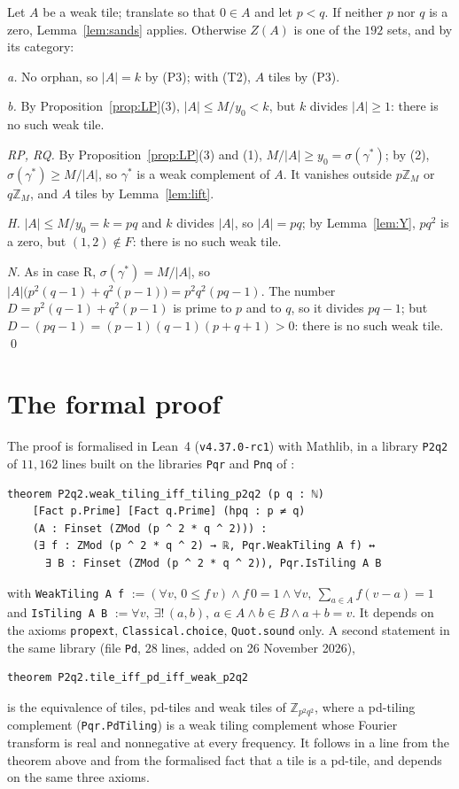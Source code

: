 \documentclass[11pt,a4paper]{amsart}
\theoremstyle{definition}
\theoremstyle{remark}
\newcommand{\Z}{\mathbb{Z}}
\newcommand{\lean}[1]{\texttt{#1}}
\newcommand{\gs}{\gamma}
\begin{document}
Let $A$ be a weak tile; translate so that $0\in A$ and let $p<q$. If neither $p$ nor $q$ is a zero,
Lemma~\ref{lem:sands} applies. Otherwise $Z(A)$ is one of the $192$ sets, and by its category:

\emph{a.} No orphan, so $|A|=k$ by (P3); with (T2), $A$ tiles by (P3).

\emph{b.} By Proposition~\ref{prop:LP}(3), $|A|\le M/y_0<k$, but $k$ divides $|A|\ge1$: there is no such weak
tile.

\emph{RP, RQ.} By Proposition~\ref{prop:LP}(3) and (1), $M/|A|\ge y_0=\sigma(\gs^*)$; by (2),
$\sigma(\gs^*)\ge M/|A|$, so $\gs^*$ is a weak complement of $A$. It vanishes outside $p\Z_M$ or $q\Z_M$, and $A$
tiles by Lemma~\ref{lem:lift}.

\emph{H.} $|A|\le M/y_0=k=pq$ and $k$ divides $|A|$, so $|A|=pq$; by Lemma~\ref{lem:Y}, $pq^2$ is a zero, but
$(1,2)\notin F$: there is no such weak tile.

\emph{N.} As in case R, $\sigma(\gs^*)=M/|A|$, so $|A|\bigl(p^2(q-1)+q^2(p-1)\bigr)=p^2q^2(pq-1)$. The number
$D=p^2(q-1)+q^2(p-1)$ is prime to $p$ and to $q$, so it divides $pq-1$; but $D-(pq-1)=(p-1)(q-1)(p+q+1)>0$:
there is no such weak tile. \qed

\section{The formal proof}\label{sec:lean}

The proof is formalised in Lean~4 (\texttt{v4.37.0-rc1}) with Mathlib, in a library \lean{P2q2} of $11{,}162$
lines built on the libraries \lean{Pqr} and \lean{Pnq} of \cite{NY}:
\begin{verbatim}
theorem P2q2.weak_tiling_iff_tiling_p2q2 (p q : ℕ)
    [Fact p.Prime] [Fact q.Prime] (hpq : p ≠ q)
    (A : Finset (ZMod (p ^ 2 * q ^ 2))) :
    (∃ f : ZMod (p ^ 2 * q ^ 2) → ℝ, Pqr.WeakTiling A f) ↔
      ∃ B : Finset (ZMod (p ^ 2 * q ^ 2)), Pqr.IsTiling A B
\end{verbatim}
with \lean{WeakTiling A f} $:=(\forall v,\,0\le f\,v)\wedge f\,0=1\wedge\forall v,\ \sum_{a\in A}f(v-a)=1$ and
\lean{IsTiling A B} $:=\forall v,\ \exists!\,(a,b),\ a\in A\wedge b\in B\wedge a+b=v$. It depends on the axioms
\lean{propext}, \lean{Classical.choice}, \lean{Quot.sound} only. A second statement in the same library (file
\lean{Pd}, $28$ lines, added on 26 November 2026),
\begin{verbatim}
theorem P2q2.tile_iff_pd_iff_weak_p2q2
\end{verbatim}
is the equivalence of tiles, pd-tiles and weak tiles of $\Z_{p^2q^2}$, where a pd-tiling complement
(\lean{Pqr.PdTiling}) is a weak tiling complement whose Fourier transform is real and nonnegative at every
frequency. It follows in a line from the theorem above and from the formalised fact that a tile is a pd-tile,
and depends on the same three axioms.
\end{document}
